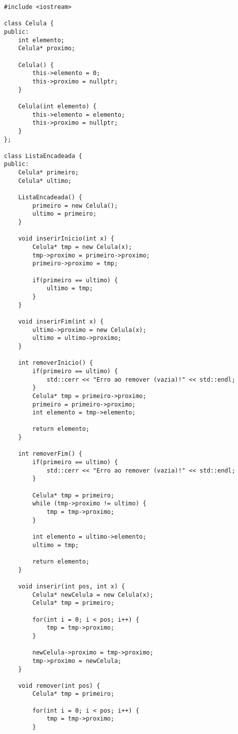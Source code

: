 \documentclass{article}
\begin{document}
\lstset{language=C++}
\begin{lstlisting}
#include <iostream>

class Celula {
public:
    int elemento;
    Celula* proximo;

    Celula() {
        this->elemento = 0;
        this->proximo = nullptr;
    }

    Celula(int elemento) {
        this->elemento = elemento;
        this->proximo = nullptr;
    }
};

class ListaEncadeada {
public:
    Celula* primeiro;
    Celula* ultimo;

    ListaEncadeada() {
        primeiro = new Celula();
        ultimo = primeiro;
    }

    void inserirInicio(int x) {
        Celula* tmp = new Celula(x);
        tmp->proximo = primeiro->proximo;
        primeiro->proximo = tmp;

        if(primeiro == ultimo) {
            ultimo = tmp;
        }
    }

    void inserirFim(int x) {
        ultimo->proximo = new Celula(x);
        ultimo = ultimo->proximo;
    }

    int removerInicio() {
        if(primeiro == ultimo) {
            std::cerr << "Erro ao remover (vazia)!" << std::endl;
        }
        Celula* tmp = primeiro->proximo;
        primeiro = primeiro->proximo;
        int elemento = tmp->elemento;

        return elemento;
    }

    int removerFim() {
        if(primeiro == ultimo) {
            std::cerr << "Erro ao remover (vazia)!" << std::endl;
        }

        Celula* tmp = primeiro;
        while (tmp->proximo != ultimo) {
            tmp = tmp->proximo;
        }

        int elemento = ultimo->elemento;
        ultimo = tmp;

        return elemento;
    }

    void inserir(int pos, int x) {
        Celula* newCelula = new Celula(x);
        Celula* tmp = primeiro;

        for(int i = 0; i < pos; i++) {
            tmp = tmp->proximo;
        }

        newCelula->proximo = tmp->proximo;
        tmp->proximo = newCelula;
    }

    void remover(int pos) {
        Celula* tmp = primeiro;

        for(int i = 0; i < pos; i++) {
            tmp = tmp->proximo;
        }


\end{lstlisting}
\end{document}

